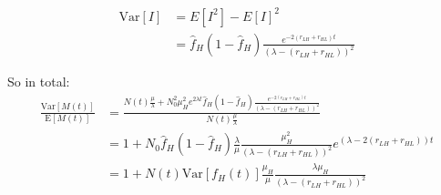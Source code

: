 \begin{align*}
\text{Var}[I] &= E[I^{2}] - E[I]^{2} \\
&= \hat{f}_{H} \left(1 - \hat{f}_{H}\right) \frac{e^{-2(r_{LH} + r_{HL})t}}{\left(\lambda - (r_{LH} + r_{HL})\right)^{2}}
\end{align*}

So in total:
\begin{align*}
\frac{\text{Var}[M(t)]}{\text{E}[M(t)]} &= \frac{N(t) \frac{\mu}{\lambda} + N_{0}^{2} \mu_{H}^{2} e^{2 \lambda t} \hat{f}_{H} (1 - \hat{f}_{H}) \frac{e^{-2(r_{LH} + r_{HL}) t}}{\left(\lambda - (r_{LH} + r_{HL})\right)^{2}}}{N(t) \frac{\mu}{\lambda}} \\
&= 1 + N_{0} \hat{f}_{H} (1 - \hat{f}_{H}) \frac{\lambda}{\mu} \frac{\mu_{H}^{2}}{\left(\lambda - (r_{LH} + r_{HL})\right)^{2}} e^{(\lambda - 2(r_{LH} + r_{HL})) t} \\
&= 1 + N(t) \text{Var}[f_{H}(t)] \frac{\mu_{H}}{\mu} \frac{\lambda \mu_{H}}{\left(\lambda - (r_{LH} + r_{HL})\right)^{2}}
\end{align*}